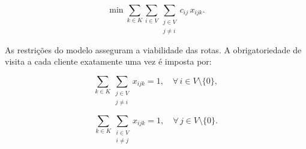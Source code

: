 
\begin{equation}
    \min \sum_{k \in K} \sum_{i \in V} \sum_{\substack{j \in V \\ j \neq i}} 
    c_{ij}\, x_{ijk}.
    \label{eq:fo_vrp}
\end{equation}

As restrições do modelo asseguram a viabilidade das rotas. A obrigatoriedade de visita a cada cliente exatamente uma vez é imposta por:


\begin{equation}
    \sum_{k \in K} \sum_{\substack{j \in V \\ j \neq i}} x_{ijk} = 1, 
    \quad \forall\, i \in V \setminus \{0\},
    \label{eq:visita_saida}
\end{equation}

\begin{equation}
    \sum_{k \in K} \sum_{\substack{i \in V \\ i \neq j}} x_{ijk} = 1, 
    \quad \forall\, j \in V \setminus \{0\}.
    \label{eq:visita_entrada}
\end{equation}



